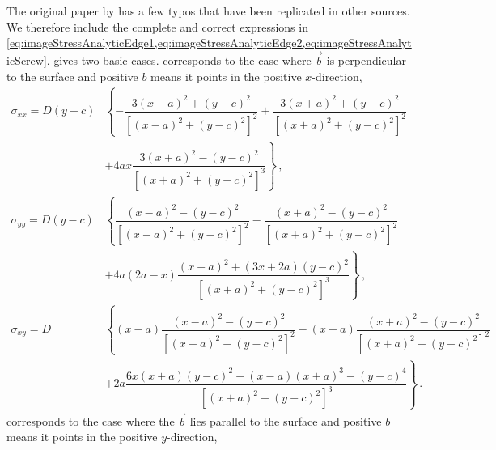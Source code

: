 The original paper by \citet{head1953edge} has a few typos that have been replicated in other sources. We therefore include the complete and correct expressions in \cref{eq:imageStressAnalyticEdge1,eq:imageStressAnalyticEdge2,eq:imageStressAnalyticScrew}. \citet{head1953edge} gives two basic cases.  corresponds to the case where $\vec{b}$ is perpendicular to the surface and positive $b$ means it points in the positive $x$-direction,
\begin{subequations}\label{eq:imageStressAnalyticEdge1}
    \begin{align}
        \sigma_{xx} = D (y - c) & \left\{-\dfrac{3 (x - a)^2 + (y - c)^2}{[(x - a)^2 + (y - c)^2]^2} + \dfrac{3 (x + a)^2 + (y - c)^2}{[(x + a)^2 + (y - c)^2]^2}\right.                                             \\\nonumber
                                & \left. + 4 a x \dfrac{3 (x + a)^2 - (y - c)^2}{[(x + a)^2 + (y - c)^2]^3}\right\}\,,                                                                                               \\
        \sigma_{yy} = D (y - c) & \left\{\dfrac{(x - a)^2 - (y - c)^2}{[(x - a)^2 + (y - c)^2]^2} - \dfrac{(x + a)^2 - (y - c)^2}{[(x + a)^2 + (y - c)^2]^2}                                                 \right. \\\nonumber
                                & \left. + 4 a (2 a - x) \dfrac{(x + a)^2 + (3 x + 2 a) (y - c)^2}{[(x + a)^2 + (y - c)^2]^3}\right\}\,,                                                                             \\
        \sigma_{xy} = D         & \left\{(x - a) \dfrac{(x - a)^2 - (y - c)^2}{[(x - a)^2 + (y - c)^2]^2} - (x + a) \dfrac{(x + a)^2 - (y - c)^2}{[(x + a)^2 + (y - c)^2]^2}\right.                                  \\\nonumber
                                & \left. + 2 a \dfrac{6 x (x + a) (y - c)^2 - (x - a) (x + a)^3 - (y - c)^4}{[(x + a)^2 + (y - c)^2]^3}\right\}\,.
    \end{align}
\end{subequations}
 corresponds to the case where the $\vec{b}$ lies parallel to the surface and positive $b$ means it points in the positive $y$-direction,
